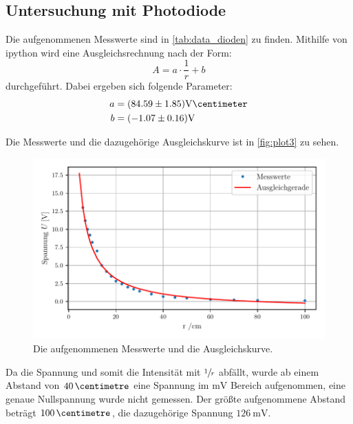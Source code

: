 \subsection{Untersuchung mit Photodiode}
\label{subsec:Photodiode}

Die aufgenommenen Messwerte sind in \autoref{tab:data_dioden} zu finden.
Mithilfe von ipython wird eine Ausgleichsrechnung nach der Form:
\begin{equation*}
  A = a \cdot \frac{1}{r} + b
\end{equation*}
durchgeführt.
Dabei ergeben sich folgende Parameter:
\begin{align*}
  a &= (84.59 \pm 1.85) \si{\volt\centimeter}\\
  b &= (-1.07 \pm 0.16) \si{\volt}
\end{align*}

Die Messwerte und die dazugehörige Ausgleichskurve ist in \autoref{fig:plot3} zu sehen.
\begin{figure}
  \centering
  \includegraphics[width=\textwidth]{content/abbildungen/plot3.pdf}
  \caption{Die aufgenommenen Messwerte und die Ausgleichskurve.}
  \label{fig:plot3}
\end{figure}

\noindent
Da die Spannung und somit die Intensität mit $\sfrac{1}{r}$ abfällt, wurde ab einem Abstand von $\SI{40}{\centimetre}$ eine Spannung im
$\si{\milli\volt}$ Bereich aufgenommen, eine genaue Nullspannung wurde nicht gemessen.
Der größte aufgenommene Abstand beträgt $\SI{100}{\centimetre}$, die dazugehörige Spannung $\SI{126}{\milli\volt}$.

